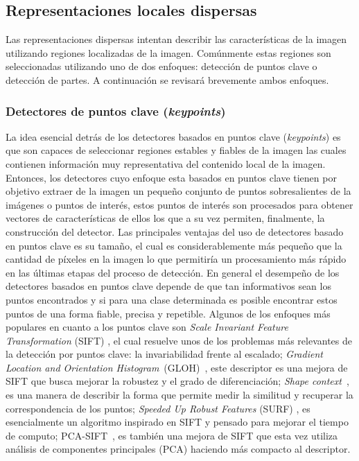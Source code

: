 \subsection{Representaciones locales dispersas}
\label{caract:dispersas}

Las representaciones dispersas intentan describir las características de la imagen utilizando regiones localizadas de la imagen. Comúnmente estas regiones son seleccionadas utilizando uno de dos enfoques: detección de puntos clave o detección de partes. A continuación se revisará brevemente ambos enfoques.

\subsubsection{Detectores de puntos clave (\textit{keypoints})}

La idea esencial detrás de los detectores basados en puntos clave (\textit{keypoints}) es que son capaces de seleccionar regiones estables y fiables de la imagen las cuales contienen información muy representativa del contenido local de la imagen. Entonces, los detectores cuyo enfoque esta basados en puntos clave tienen por objetivo extraer de la imagen un pequeño conjunto de puntos sobresalientes de la imágenes o puntos de interés, estos puntos de interés son procesados para obtener vectores de características de ellos los que a su vez permiten, finalmente, la construcción del detector. Las principales ventajas del uso de detectores basado en puntos clave es su tamaño, el cual es considerablemente más pequeño que la cantidad de píxeles en la imagen lo que permitiría un procesamiento más rápido en las últimas etapas del proceso de detección. En general el desempeño de los detectores basados en puntos clave depende de que tan informativos sean los puntos encontrados y si para una clase determinada es posible encontrar estos puntos de una forma fiable, precisa y repetible. Algunos de los enfoques más populares \citep{gupta2008} en cuanto a los puntos clave son \textit{Scale Invariant Feature Transformation} (SIFT) \citep{Lowe2004}, el cual resuelve unos de los problemas más relevantes de la detección por puntos clave: la invariabilidad frente al escalado; \textit{Gradient Location and Orientation Histogram}~(GLOH)~\citep{Mikolajczyk2005}, este descriptor es una mejora de SIFT que busca mejorar la robustez y el grado de diferenciación; \textit{Shape context}~\citep{Belongie2002}, es una manera de describir la forma que permite medir la similitud y recuperar la correspondencia de los puntos; \textit{Speeded Up Robust Features} (SURF) \citep{Bay2006}, es esencialmente un algoritmo inspirado en SIFT y pensado para mejorar el tiempo de computo; PCA-SIFT~\citep{Ke2004}, es también una mejora de SIFT que esta vez utiliza análisis de componentes principales (PCA) haciendo más compacto al descriptor.

